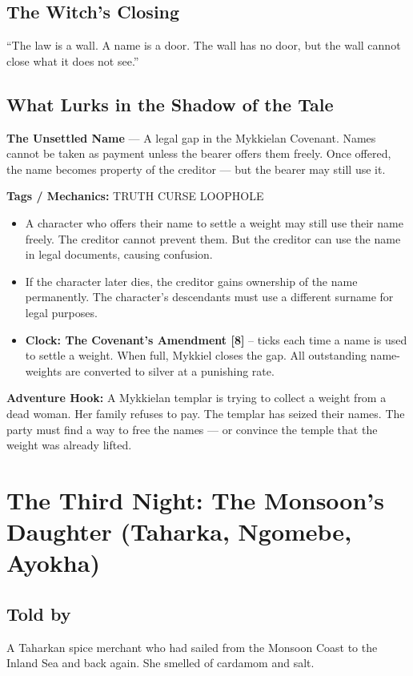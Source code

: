 \documentclass[10pt,twoside]{book}
\newcommand{\tag}[1]{\textsc{#1}}
\begin{document}
\section*{The Witch's Closing}
``The law is a wall. A name is a door. The wall has no door, but the wall cannot close what it does not see.''

\section*{What Lurks in the Shadow of the Tale}
\begin{infobox}
\textbf{The Unsettled Name} --- A legal gap in the Mykkielan Covenant. Names cannot be taken as payment unless the bearer offers them freely. Once offered, the name becomes property of the creditor --- but the bearer may still use it.

\textbf{Tags / Mechanics:} \tag{TRUTH} \tag{CURSE} \tag{LOOPHOLE}

\begin{itemize}
\item A character who offers their name to settle a weight may still use their name freely. The creditor cannot prevent them. But the creditor can use the name in legal documents, causing confusion.
\item If the character later dies, the creditor gains ownership of the name permanently. The character's descendants must use a different surname for legal purposes.
\item \textbf{Clock: The Covenant's Amendment [8]} -- ticks each time a name is used to settle a weight. When full, Mykkiel closes the gap. All outstanding name-weights are converted to silver at a punishing rate.
\end{itemize}

\textbf{Adventure Hook:} A Mykkielan templar is trying to collect a weight from a dead woman. Her family refuses to pay. The templar has seized their names. The party must find a way to free the names --- or convince the temple that the weight was already lifted.
\end{infobox}

\chapter{The Third Night: The Monsoon's Daughter (Taharka, Ngomebe, Ayokha)}

\section*{Told by}
A Taharkan spice merchant who had sailed from the Monsoon Coast to the Inland Sea and back again. She smelled of cardamom and salt.
\end{document}
